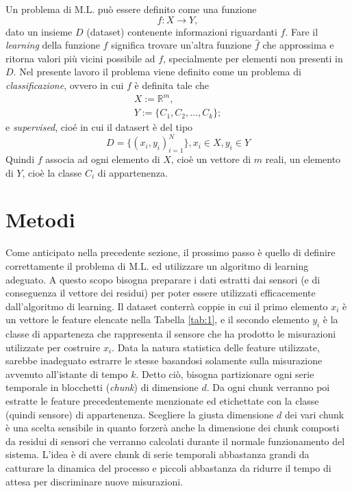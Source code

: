 \documentclass[Lau,binding=0.6cm]{sapthesis}
\begin{document}
Un problema di M.L. pu\`o essere definito come una funzione 
\begin{equation}
f: X \to Y,\label{eq:3}
\end{equation}
dato un insieme $D$ (dataset) contenente informazioni riguardanti $f$.
Fare il \textit{learning} della funzione $f$ significa trovare un'altra funzione $\hat{f}$ che approssima e ritorna valori più vicini possibile ad $f$, specialmente per elementi non presenti in $D$.
Nel presente lavoro il problema viene definito come un problema di \textit{classificazione}, ovvero in cui $f$ \`e definita tale che
\begin{equation}
    \begin{array}{l}
    X := \mathbb{R}^m, \\
    Y := \{ C_1, C_2, \ldots, C_k \};
    \end{array}
\end{equation} 
e \textit{supervised}, cio\'e in cui il datasert \`e del tipo
\begin{equation}
    D = \{ (x_i, y_i)_{i=1}^N \}, x_i\in X, y_i\in Y
\end{equation}
Quindi $f$ associa ad ogni elemento di $X$, cio\`e un vettore di $m$ reali, un elemento di $Y$, cio\`e la classe $C_i$ di appartenenza.


\chapter{Metodi}\label{chap:3}

Come anticipato nella precedente sezione, il prossimo passo \`e quello di definire correttamente il problema di M.L. ed utilizzare un algoritmo di learning adeguato.
A questo scopo bisogna preparare i dati estratti dai sensori (e di conseguenza il vettore dei residui) per poter essere utilizzati efficacemente dall'algoritmo di learning.
Il dataset conterr\`a coppie in cui il primo elemento $x_i$ \`e un vettore le feature elencate nella Tabella \ref{tab:1}, e il secondo elemento $y_i$ \`e la classe di apparteneza che rappresenta il sensore che ha prodotto le misurazioni utilizzate per costruire $x_i$.
Data la natura statistica delle feature utilizzate, sarebbe inadeguato estrarre le stesse basandosi solamente sulla misurazione avvenuto all'istante di tempo $k$.
Detto ci\`o, bisogna partizionare ogni serie temporale in blocchetti (\textit{chunk}) di dimensione $d$. 
Da ogni chunk verranno poi estratte le feature precedentemente menzionate ed etichettate con la classe (quindi sensore) di appartenenza.
Scegliere la giusta dimensione $d$ dei vari chunk \`e una scelta sensibile in quanto forzer\`a anche la dimensione dei chunk composti da residui di sensori che verranno calcolati durante il normale funzionamento del sistema.
L'idea \`e di avere chunk di serie temporali abbastanza grandi da catturare la dinamica del processo e piccoli abbastanza da ridurre il tempo di attesa per discriminare nuove misurazioni.
\end{document}
